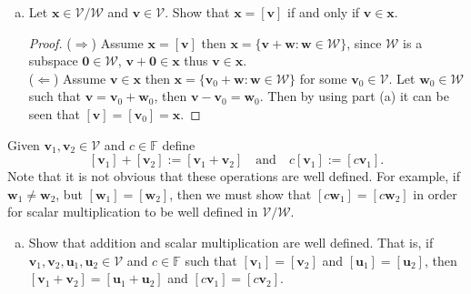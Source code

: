 \documentclass[12pt]{amsart}
\newcommand{\1}{\mathbbm{1}}
\numberwithin{equation}{section}
\numberwithin{Theorem}{section}
\theoremstyle{plain} %
\theoremstyle{definition}
\theoremstyle{remark}
\begin{document}
\begin{enumerate}[1.]
\begin{enumerate}[(a)]
\item Let \(\mathbf{x}\in\mathcal{V}/\mathcal{W}\) and \(\mathbf{v}\in\mathcal{V}\). Show that \(\mathbf{x}=[\mathbf{v}]\) if and only if \(\mathbf{v}\in\mathbf{x}\).

\bigskip

\begin{proof}
($\Rightarrow$) 
Assume \(\mathbf{x}=[\mathbf{v}]\) then
\(\mathbf{x} = \{\mathbf{v}+\mathbf{w}:\mathbf{w}\in\mathcal{W}\}\), 
since $\mathcal{W}$ is a subspace $\mathbf{0}\in\mathcal{W}$,
\(\mathbf{v}+\mathbf{0}\in\mathbf{x}\)
thus \(\mathbf{v}\in\mathbf{x}\). \\

($\Leftarrow$)
Assume $\mathbf{v}\in\mathbf{x}$ then
\(\mathbf{x} = \{\mathbf{v}_0+\mathbf{w}:\mathbf{w}\in\mathcal{W}\}\)
for some $\mathbf{v}_0\in\mathcal{V}$.
Let $\mathbf{w}_0\in\mathcal{W}$ such that 
\(\mathbf{v}=\mathbf{v}_0+\mathbf{w}_0\), then
\(\mathbf{v}-\mathbf{v}_0=\mathbf{w}_0\).
Then by using part (a) it can be seen that 
\([\mathbf{v}]=[\mathbf{v}_0]=\mathbf{x}\).
\end{proof}

\end{enumerate}

\noindent Given \(\mathbf{v}_{1},\mathbf{v}_{2}\in\mathcal{V}\) and \(c\in\mathbb{F}\) define
\[[\mathbf{v}_{1}]+[\mathbf{v}_{2}]:=[\mathbf{v}_{1}+\mathbf{v}_{2}]\quad\text{and}\quad c[\mathbf{v}_{1}] := [c\mathbf{v}_{1}].\]
Note that it is not obvious that these operations are well defined. For example, if \(\mathbf{w}_{1}\neq \mathbf{w}_{2}\), but \([\mathbf{w}_{1}]=[\mathbf{w}_{2}]\), then we must show that \([c\mathbf{w}_{1}]=[c\mathbf{w}_{2}]\) in order for scalar multiplication to be well defined in \(\mathcal{V}/\mathcal{W}\).\bigskip

\begin{enumerate}[(a)]

\addtocounter{enumii}{2}

\item Show that addition and scalar multiplication are well defined. That is, if \(\mathbf{v}_{1},\mathbf{v}_{2},\mathbf{u}_{1},\mathbf{u}_{2}\in\mathcal{V}\) and \(c\in\mathbb{F}\) such that \([\mathbf{v}_{1}]=[\mathbf{v}_{2}]\) and \([\mathbf{u}_{1}]=[\mathbf{u}_{2}]\), then \([\mathbf{v}_{1}+\mathbf{v}_{2}]=[\mathbf{u}_{1}+\mathbf{u}_{2}]\) and \([c\mathbf{v}_{1}]=[c\mathbf{v}_{2}]\).


\end{enumerate}
\end{enumerate}
\end{document}

